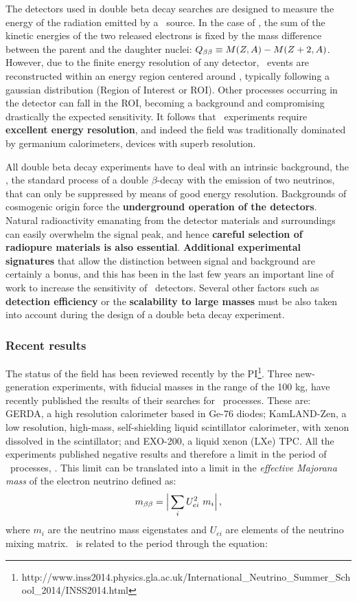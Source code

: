 The detectors used in double beta decay searches are designed to measure the energy of the radiation emitted by a \bb\ source. In the case of \bbonu, the sum of the kinetic energies of the two released electrons is fixed by the mass difference between the parent and the daughter nuclei: $Q_{\beta\beta} \equiv M(Z,A)-M(Z+2,A)$. However, due to the finite energy resolution of any detector, \bbonu\ events are reconstructed within an energy region centered around \Qbb, typically following a gaussian distribution (Region of Interest or ROI). Other processes occurring in the detector can fall in the ROI, becoming a background and compromising drastically the expected sensitivity. It follows that \bbonu\ experiments require {\bf excellent energy resolution}, and indeed the field was traditionally dominated by germanium calorimeters, devices with superb resolution.

All double beta decay experiments have to deal with an intrinsic background, the \bbtnu, the standard process of a double $\beta$-decay with the emission of two neutrinos, that can only be suppressed by means of good energy resolution. Backgrounds of cosmogenic origin force the {\bf underground operation of the detectors}. Natural radioactivity emanating from the detector materials and surroundings can easily overwhelm the signal peak, and hence {\bf careful selection of radiopure materials is also essential}. 
{\bf Additional experimental signatures} that allow the distinction between signal and background are certainly a bonus, and this has been in the last few years an important line of work to increase the sensitivity of \bbonu\ detectors. Several other factors such as {\bf detection efficiency} or the {\bf scalability to large masses} must be also taken into account during the design of a double beta decay experiment.
 
 \subsubsection*{Recent results}
 The status of the field has been reviewed recently by the PI\footnote{http://www.inss2014.physics.gla.ac.uk/International\_Neutrino\_Summer\_School\_2014/INSS2014.html}.
 Three new-generation experiments, with fiducial masses in the range of the 100 kg, have recently published the results of their searches for \bbonu\ processes. These are: GERDA, a high resolution calorimeter based in Ge-76 diodes; KamLAND-Zen, a low resolution, high-mass, self-shielding liquid scintillator calorimeter, with xenon dissolved in the scintillator; and EXO-200, a liquid xenon (LXe) TPC. All the experiments published negative results and therefore a limit in the period of \bbonu\ processes, \Tonu. This limit can be translated into a limit in the \emph{effective Majorana mass} of the electron neutrino defined as:
\begin{equation}
m_{\beta\beta} = \Big| \sum_{i} U^{2}_{ei} \ m_{i} \Big| \, ,
\end{equation}
%
where $m_{i}$ are the neutrino mass eigenstates and $U_{ei}$ are elements of the neutrino mixing matrix. \mbb\ is related to the period through the equation:

